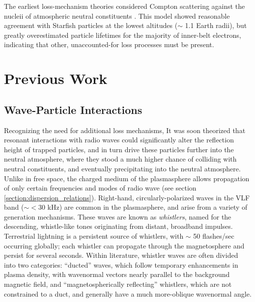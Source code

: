 The earliest loss-mechanism theories considered Compton scattering against the nucleii of atmospheric neutral constituents \citep{Walt1964}. This model showed reasonable agreement with Starfish particles at the lowest altitudes ($\sim$ 1.1 Earth radii), but greatly overestimated particle lifetimes for the majority of inner-belt electrons, indicating that other, unaccounted-for loss processes must be present. 


\section{Previous Work}

\subsection{Wave-Particle Interactions}
Recognizing the need for additional loss mechanisms, It was soon theorized that resonant interactions with radio waves could significantly alter the reflection height of trapped particles, and in turn drive these particles further into the neutral atmosphere, where they stood a much higher chance of colliding with neutral constituents, and eventually precipitating into the neutral atmosphere. Unlike in free space, the charged medium of the plasmasphere allows propagation of only certain frequencies and modes of radio wave (see section \ref{section:dispersion_relations}). Right-hand, circularly-polarized waves in the VLF band ($\sim < 30 $ kHz) are common in the plasmasphere, and arise from a variety of generation mechanisms. These waves are known as \emph{whistlers}, named for the descending, whistle-like tones originating from distant, broadband impulses. Terrestrial lightning is a persistent source of whistlers, with $\sim$ 50 flashes/sec occurring globally; each whistler can propagate through the magnetosphere and persist for several seconds. Within literature, whistler waves are often divided into two categories: ``ducted'' waves, which follow temporary enhancements in plasma density, with wavenormal vectors nearly parallel to the background magnetic field, and ``magnetospherically reflecting'' whistlers, which are not constrained to a duct, and generally have a much more-oblique wavenormal angle.

